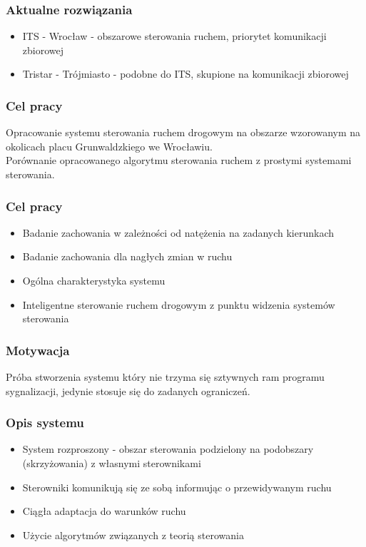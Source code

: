 \documentclass[17pt]{beamer}
\begin{document}
\begin{frame}[shrink=5]
 \frametitle{\vspace{22px}Aktualne rozwiązania}
 \begin{itemize}
  \item{ITS - Wrocław - obszarowe sterowania ruchem, priorytet komunikacji zbiorowej}
  \item{Tristar - Trójmiasto - podobne do ITS, skupione na komunikacji zbiorowej}
 \end{itemize}
\end{frame}

\begin{frame}[shrink=5]
 \frametitle{\vspace{22px}Cel pracy}
 Opracowanie systemu sterowania ruchem drogowym na obszarze wzorowanym na okolicach placu Grunwaldzkiego we Wrocławiu.\\
 Porównanie opracowanego algorytmu sterowania ruchem z prostymi systemami sterowania.
\end{frame}

\begin{frame}[shrink=5]
 \frametitle{\vspace{22px}Cel pracy}
 \begin{itemize}
  \item{Badanie zachowania w zależności od natężenia na zadanych kierunkach}
  \item{Badanie zachowania dla nagłych zmian w ruchu}
  \item{Ogólna charakterystyka systemu}
  \item{Inteligentne sterowanie ruchem drogowym z punktu widzenia systemów sterowania}
 \end{itemize}
\end{frame}

\begin{frame}[shrink=5]
 \frametitle{\vspace{22px}Motywacja}
 Próba stworzenia systemu który nie trzyma się sztywnych ram programu sygnalizacji, jedynie stosuje się do zadanych ograniczeń.
\end{frame}

\begin{frame}[shrink=5]
 \frametitle{\vspace{22px}Opis systemu}
 \begin{itemize}
  \item{System rozproszony - obszar sterowania podzielony na podobszary (skrzyżowania) z własnymi sterownikami}
  \item{Sterowniki komunikują się ze sobą informując o przewidywanym ruchu}
  \item{Ciągła adaptacja do warunków ruchu}
  \item{Użycie algorytmów związanych z teorią sterowania}
 \end{itemize}
\end{frame}
\end{document}
